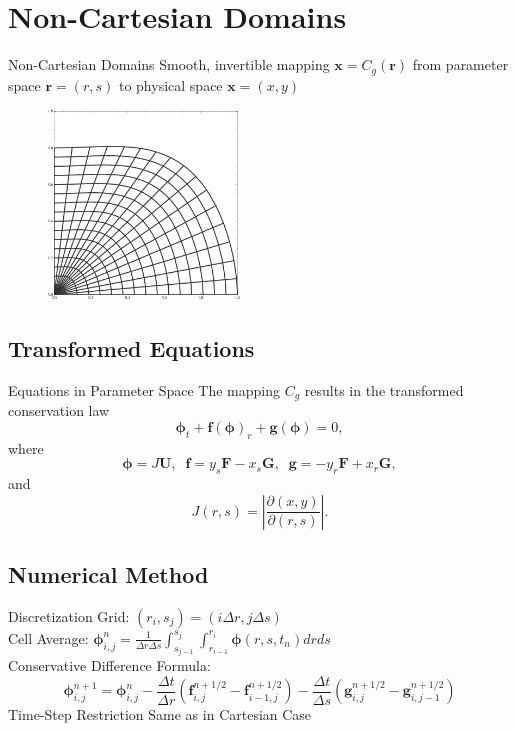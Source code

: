 \documentclass{beamer}
\newcommand{\mbf}{\mathbf}
\newcommand{\bq}{\begin{equation}}
\newcommand{\eq}{\end{equation}}
\begin{document}
\section{Non-Cartesian Domains}
\begin{frame}{Non-Cartesian Domains}
Smooth, invertible mapping $\mbf{x}=C_g(\mbf{r})$ from parameter space $\mbf{r}=(r,s)$ to physical space $\mbf{x}=(x,y)$
\begin{figure}[h]
\centering
\includegraphics[width=2in]{curvGrid}
\end{figure}
\end{frame}

\subsection{Transformed Equations}
\begin{frame}{Equations in Parameter Space}
The mapping $C_g$ results in the transformed conservation law
\bq \mbf{\phi}_t+\mbf{f}(\mbf{\phi})_r+\mbf{g}(\mbf{\phi})=0,\eq
where
\bq \mbf{\phi}=J \mbf{U},\;\; \mbf{f}=y_s\mbf{F}-x_s\mbf{G},\;\; \mbf{g}=-y_r\mbf{F}+x_r\mbf{G},\eq
and
$$J(r,s)=\left|\frac{\partial(x,y)}{\partial(r,s)}\right|.$$
\end{frame}

\subsection{Numerical Method}
\begin{frame}{Discretization}
Grid: $(r_i,s_j)=(i\Delta r,j\Delta s)$\\
Cell Average: $\mbf{\phi}_{i,j}^n=\frac{1}{\Delta r\Delta s}\int_{s_{j-1}}^{s_j}\int_{r_{i-1}}^{r_i}\mbf{\phi}(r,s,t_n)drds$\\
Conservative Difference Formula:
\bq \mbf{\phi}_{i,j}^{n+1}=\mbf{\phi}_{i,j}^n-\frac{\Delta t}{\Delta r}\left(\mbf{f}_{i,j}^{n+1/2}-\mbf{f}_{i-1,j}^{n+1/2}\right)-\frac{\Delta t}{\Delta s}\left(\mbf{g}_{i,j}^{n+1/2}-\mbf{g}_{i,j-1}^{n+1/2}\right)\eq
Time-Step Restriction Same as in Cartesian Case
\end{frame}
\end{document}
